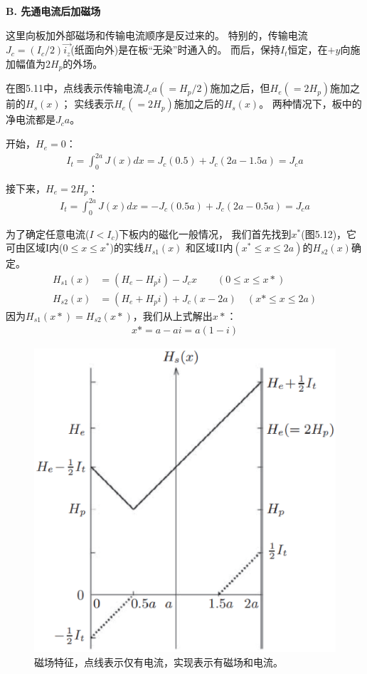 \textbf{B. 先通电流后加磁场}

这里向板加外部磁场和传输电流顺序是反过来的。
特别的，传输电流$J_c=(I_c/2)\vec{i_z}$(纸面向外)是在板“无染”时通入的。
而后，保持$I_t$恒定，在$+y$向施加幅值为$2H_p$的外场。

在图5.11中，点线表示传输电流$J_c a(=H_p/2)$施加之后，但$H_e(=2H_p)$施加之前的$H_s(x)$；
实线表示$H_e(=2H_p)$施加之后的$H_s(x)$。
两种情况下，板中的净电流都是$J_c a$。

开始，$H_e=0$：
\begin{align*}%
I_{t}=\int_{0}^{2a}J(x)dx=J_{c}(0.5)+J_{c}(2a-1.5a)=J_{c}a
\end{align*}

接下来，$H_e=2H_p$：
\begin{align*}%
I_{t}=\int_{0}^{2a}J(x)dx=-J_{c}(0.5a)+J_{c}(2a-0.5a)=J_{c}a
\end{align*}

为了确定任意电流($I<I_c$)下板内的磁化一般情况，
我们首先找到$x^*$(图5.12)，它可由区域I内($0\le x\le x^*$)的实线$H_{s1}(x)$
和区域II内$(x^*\le x\le 2a)$的$H_{s2}(x)$确定。
\begin{align*}
H_{s1}(x)&=(H_{e}-H_{p}i)-J_{c}x\qquad(0\leq x \leq x*)\\
H_{s2}(x)&=(H_{e}+H_{p}i)+J_{c}(x-2a)\quad(x*\leq x \le  2a)
\end{align*}
因为$H_{s1}(x*)=H_{s2}(x*)$，我们从上式解出$x*$：
\begin{align*}%
x*=a-ai=a(1-i)
\end{align*}

\begin{figure}[htbp]
	\centering
	\includegraphics[scale=0.5]{chpt5/figs/fig5.11.eps}
	\caption{磁场特征，点线表示仅有电流，实现表示有磁场和电流。}
\end{figure}


